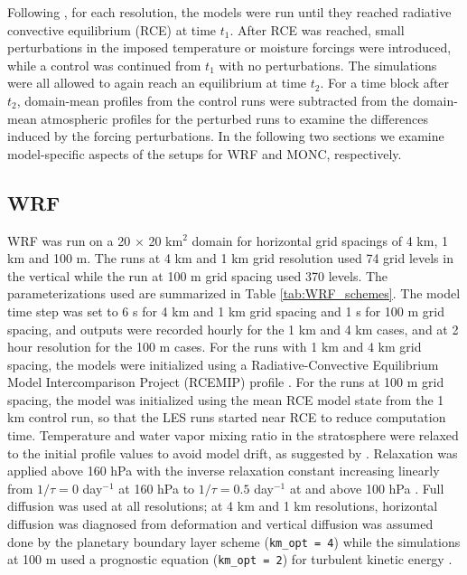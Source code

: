 \documentclass[draft]{agujournal2019}
\begin{document}
Following , for each resolution, the models were run until
they reached radiative convective equilibrium (RCE) at time $t_1$. After RCE was
reached, small perturbations in the imposed temperature or moisture forcings
were introduced, while a control was continued from $t_1$ with no perturbations. The simulations
were all allowed to again reach an equilibrium at time $t_2$. For a time block after $t_2$,
domain-mean profiles from the control runs were subtracted from the  domain-mean
atmospheric profiles for the perturbed runs to examine the differences induced by
the forcing perturbations. In the following two sections we examine model-specific aspects of the
setups for WRF and MONC, respectively.

\subsection{WRF}

WRF was run on a 20 $\times$ 20 km$^2$ domain for horizontal grid spacings of 4
km, 1 km and 100 m. The runs at 4 km and 1 km grid resolution used 74 grid
levels in the vertical while the run at 100 m grid spacing used 370 levels. The parameterizations used are summarized in Table
\ref{tab:WRF_schemes}. The model time step was set to 6 s for 4 km and 1 km grid
spacing and 1 s for 100 m grid spacing, and outputs were recorded hourly for the
1 km and 4 km cases, and at 2 hour resolution for the 100 m cases. For the runs
with 1 km and 4 km grid spacing, the models were initialized using a
Radiative-Convective Equilibrium Model Intercomparison Project (RCEMIP) profile
\cite{Wing_GMD_2018}. For the runs at 100 m grid spacing, the model was
initialized using the mean RCE model state from the 1 km control run, so that
the LES runs started near RCE to reduce computation time. Temperature and water
vapor mixing ratio in the stratosphere were relaxed to the initial profile
values to avoid model drift, as suggested by .
Relaxation was applied above 160 hPa with the inverse relaxation constant
increasing linearly from $1/\tau = 0$ day$^{-1}$ at 160 hPa to $1/\tau = 0.5$
day$^{-1}$ at and above 100 hPa \cite{Herman_JAMES_2013}. Full diffusion was
used at all resolutions; at 4 km and 1 km resolutions, horizontal diffusion was
diagnosed from deformation and vertical diffusion was assumed done by the
planetary boundary layer scheme (\texttt{km\_opt = 4}) while the simulations at
100 m used a prognostic equation (\texttt{km\_opt = 2}) for turbulent kinetic
energy \cite{Skamarock_2019}.
\end{document}

